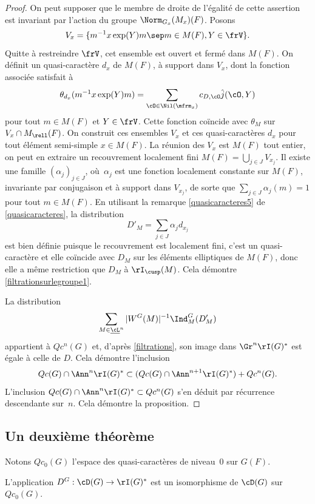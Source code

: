 \begin{proof}
On peut supposer que le membre de droite de l'égalité de cette assertion est invariant par l'action du groupe $\Norm_{G_{x}}(M_{x})(F) $. Posons
\[
V_{x}=\{m^{-1}x \exp(Y)m\sep m\in M(F), Y\in \frV\}.
\]
Quitte à restreindre $\frV$, cet ensemble est ouvert et fermé dans $M(F)$. On définit un quasi-caractère $d_{x}$ de $M(F)$, à support dans $V_{x}$, dont la fonction associée satisfait à
\[
\theta_{d_{x}}(m^{-1}x \exp(Y)m)=\sum_{\cO\in \Nil(\mfrm_{x})}c_{D,\cO}\hat{j}(\cO,Y)
\]
pour tout $m\in M(F)$ et $Y\in \frV$.
Cette fonction coïncide avec $\theta_{M}$ sur $V_{x}\cap M_{\rell}(F)$. On construit ces ensembles $V_{x}$ et ces quasi-caractères $d_{x}$ pour tout élément semi-simple $x\in M(F)$. La réunion des $V_{x}$ est $M(F)$ tout entier, on peut en extraire un recouvrement localement fini $M(F)=\bigcup_{j\in J}V_{x_{j}}$. Il existe une famille $(\alpha_{j})_{j\in J}$, où~$\alpha_{j}$ est une fonction localement constante sur $M(F)$, invariante par conjugaison et à support dans $V_{x_{j}}$, de sorte que $\sum_{j\in J}\alpha_{j}(m)=1$ pour tout $m\in M(F)$. En utilisant la remarque \eqref{quasicaracteres5} de \ref{quasicaracteres}, la distribution
\[
D'_{M}=\sum_{j\in J}\alpha_{j}d_{x_{j}}
\]
est bien définie puisque le recouvrement est localement fini, c'est un quasi-caractère et elle coïncide avec $D_{M}$ sur les éléments elliptiques de $M(F)$, donc elle a même restriction que $D_{M}$ à $\rI_{\cusp}(M)$. Cela démontre \eqref{filtrationsurlegroupe1}.

La distribution
\[
\sum_{M\in \underline{\cL}^n} \vert W^G(M)\vert ^{-1}\Ind_{M}^G(D'_{M})
\]
appartient à $Qc^n(G)$ et, d'après \ref{filtrations}, son image dans $\Gr^n\rI(G)^*$ est égale à celle de $D$. Cela démontre l'inclusion
\[
Qc(G)\cap \Ann^{n}\rI(G)^*\subset (Qc(G)\cap \Ann^{n+1}\rI(G)^*)+Qc^n(G).
\]
L'inclusion $Qc(G)\cap \Ann^{n}\rI(G)^*\subset Qc^n(G)$ s'en déduit par récurrence descendante sur~$n$. Cela démontre la proposition.
\end{proof}

\subsection{Un deuxième théorème}\label{undeuxiemetheoreme}

Notons $Qc_{0}(G)$ l'espace des quasi-caractères de niveau~$0$ sur $G(F)$.

\begin{thm*}
L'application $D^G:\cD(G)\to \rI(G)^*$ est un isomorphisme de $\cD(G)$ sur $Qc_{0}(G)$.
\end{thm*}

